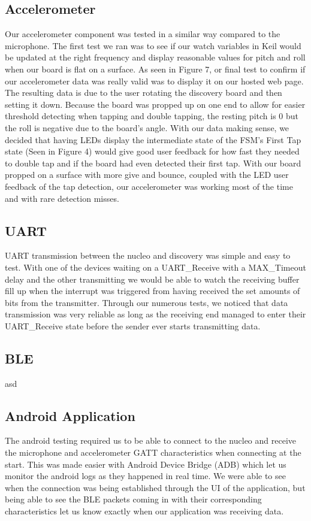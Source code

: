 \subsection{Accelerometer}
Our accelerometer component was tested in a similar way compared to the microphone. The first test we ran was to see if our watch variables in Keil would be updated at the right frequency and display reasonable values for pitch and roll when our board is flat on a surface. As seen in Figure 7, or final test to confirm if our accelerometer data was really valid was to display it on our hosted web page. The resulting data is due to the user rotating the discovery board and then setting it down. Because the board was propped up on one end to allow for easier threshold detecting when tapping and double tapping, the resting pitch is 0 but the roll is negative due to the board's angle. With our data making sense, we decided that having LEDs display the intermediate state of the FSM's First Tap state (Seen in Figure 4) would give good user feedback for how fast they needed to double tap and if the board had even detected their first tap. With our board propped on a surface with more give and bounce, coupled with the LED user feedback of the tap detection, our accelerometer was working most of the time and with rare detection misses.

\subsection{UART}
UART transmission between the nucleo and discovery was simple and easy to test. With one of the devices waiting on a UART\_Receive with a MAX\_Timeout delay and the other transmitting we would be able to watch the receiving buffer fill up when the interrupt was triggered from having received the set amounts of bits from the transmitter. Through our numerous tests, we noticed that data transmission was very reliable as long as the receiving end managed to enter their UART\_Receive state before the sender ever starts transmitting data. 

\subsection{BLE}
asd

\subsection{Android Application}
The android testing required us to be able to connect to the nucleo and receive the microphone and accelerometer GATT characteristics when connecting at the start. This was made easier with Android Device Bridge (ADB) which let us monitor the android logs as they happened in real time. We were able to see when the connection was being established through the UI of the application, but being able to see the BLE packets coming in with their corresponding characteristics let us know exactly when our application was receiving data. 

